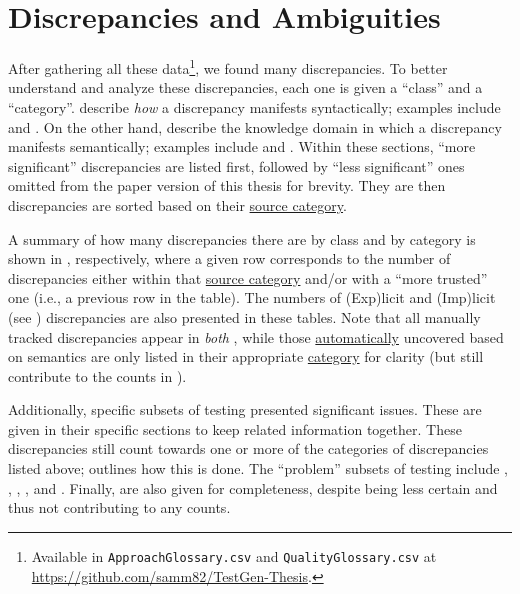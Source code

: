 \section{Discrepancies and Ambiguities}
\label{discrep}


After gathering all these data\footnote{Available in \texttt{ApproachGlossary.csv}
    and \texttt{QualityGlossary.csv} at 
    {\url{https://github.com/samm82/TestGen-Thesis}}.}, we found many
discrepancies. To better understand and analyze these discrepancies, each one
is given a ``class'' and a ``category''.  describe
\emph{how} a discrepancy manifests syntactically; examples include 
and . On the other hand,  describe the
knowledge domain in which a discrepancy manifests semantically; examples include
 and . Within these sections, \ifnotpaper ``more
    significant'' discrepancies are listed first, followed by ``less significant''
    ones omitted from the paper version of this thesis for brevity. They are
    then \else discrepancies are \fi sorted based on their
\hyperref[sources]{source category}.

A summary of how many discrepancies there are by class and by category is shown
in , respectively, where a given row
corresponds to the number of discrepancies either within that
\hyperref[sources]{source category} and/or with a ``more trusted'' one
(i.e., a previous row in the table). The numbers of (Exp)licit and (Imp)licit
(see ) discrepancies are also presented in these tables. Note
that all manually tracked discrepancies appear in \emph{both}
, while those
\hyperref[auto-discrep-analysis]{automatically} uncovered based on semantics
are only listed in their appropriate \hyperref[discrepCategories]{category} for
clarity (but still contribute to the counts in ).

Additionally, specific subsets of testing presented significant issues. These
are given in their specific sections to keep related information together.
These discrepancies still count towards one or more of the categories of
discrepancies listed above\ifnotpaper;  outlines how
this is done\fi. The ``problem'' subsets of testing include
, \ifnotpaper{}, \fi
{}, , and .
\ifnotpaper Finally,  are also given for completeness,
    despite being less certain and thus not contributing to any counts.

